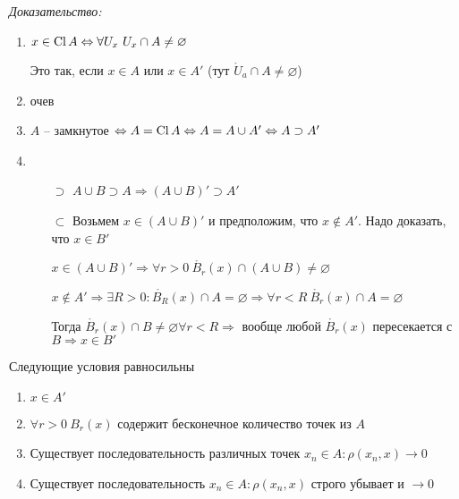 \documentclass[12pt]{article}
\begin{document}
\textit{Доказательство:}

\begin{enumerate}
    \item $x \in \operatorname{Cl} A \Leftrightarrow \forall U_x\ U_x \cap A \neq \varnothing$

    Это так, если $x \in A$ или $x \in A'$ (тут $\mathring{U}_a \cap A \neq \varnothing$)

    \item очев 
    
    \item $A$ -- замкнутое $\Leftrightarrow A = \operatorname{Cl} A \Leftrightarrow A = A \cup A' \Leftrightarrow A \supset A'$
    
    \item 
    
    \begin{itemize}
        \item[$\supset$] $A \cup B \supset A \Rightarrow (A \cup B)' \supset A'$
        \item[$\subset$] Возьмем $x \in (A \cup B)'$ и предположим, что $x \notin A'$. Надо доказать, что $x \in B'$
        
        $x \in (A \cup B)' \Rightarrow \forall r > 0\ \mathring{B_r}(x) \cap (A \cup B) \neq \varnothing$

        $x \notin A' \Rightarrow \exists R > 0 : \mathring{B_R}(x) \cap A = \varnothing \Rightarrow \forall r < R\ \mathring{B_r}(x) \cap A = \varnothing$

        Тогда $\mathring{B_r}(x) \cap B \neq \varnothing \forall r < R \Rightarrow$ вообще любой $\mathring{B_r}(x)$ пересекается с $B \Rightarrow x \in B'$
    \end{itemize}
\end{enumerate}

\begin{theo}{}
    Следующие условия равносильны

    \begin{enumerate}
        \item $x \in A'$
        \item $\forall r > 0\ B_r(x)$ содержит бесконечное количество точек из $A$
        \item Существует последовательность различных точек $x_n \in A : \rho (x_n, x) \to 0$
        \item Существует последовательность $x_n \in A : \rho(x_n, x)$ строго убывает и $\to 0$
    \end{enumerate}
\end{theo}
\end{document}

